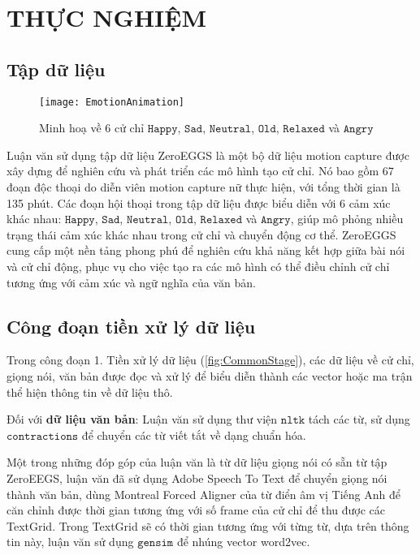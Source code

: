 \chapter{THỰC NGHIỆM}
\label{Chapter4}

\section{Tập dữ liệu}

\begin{figure}[H]
	\centering
	\texttt{[image: EmotionAnimation]}
	\caption{Minh hoạ về 6 cử chỉ $\texttt{Happy}$, $\texttt{Sad}$, $\texttt{Neutral}$, $\texttt{Old}$, $\texttt{Relaxed}$ và $\texttt{Angry}$}
\end{figure}

Luận văn sử dụng tập dữ liệu ZeroEGGS \cite{ghorbani2022zeroeggszeroshotexamplebasedgesture} là một bộ dữ liệu motion capture được xây dựng để nghiên cứu và phát triển các mô hình tạo cử chỉ. Nó bao gồm 67 đoạn độc thoại do diễn viên motion capture nữ thực hiện, với tổng thời gian là 135 phút. Các đoạn hội thoại trong tập dữ liệu được biểu diễn với 6 cảm xúc khác nhau: $\texttt{Happy}$, $\texttt{Sad}$, $\texttt{Neutral}$, $\texttt{Old}$, $\texttt{Relaxed}$ và $\texttt{Angry}$, giúp mô phỏng nhiều trạng thái cảm xúc khác nhau trong cử chỉ và chuyển động cơ thể. ZeroEGGS cung cấp một nền tảng phong phú để nghiên cứu khả năng kết hợp giữa bài nói và cử chỉ động, phục vụ cho việc tạo ra các mô hình có thể điều chỉnh cử chỉ tương ứng với cảm xúc và ngữ nghĩa của văn bản.

\section{Công đoạn tiền xử lý dữ liệu}
\label{sec:Preprocessing}

Trong công đoạn {1. Tiền xử lý dữ liệu} (\autoref{fig:CommonStage}), các dữ liệu về cử chỉ, giọng nói, văn bản được đọc và xử lý để biểu diễn thành các vector hoặc ma trận thể hiện thông tin về dữ liệu thô.

Đối với \textbf{dữ liệu văn bản}: Luận văn sử dụng thư viện $\texttt{nltk}$ tách các từ, sử dụng $\texttt{contractions}$ để chuyển các từ viết tắt về dạng chuẩn hóa.

Một trong những đóp góp của luận văn là từ dữ liệu giọng nói có sẵn từ tập ZeroEEGS, luận văn đã sử dụng Adobe Speech To Text để chuyển giọng nói thành văn bản, dùng Montreal Forced Aligner \cite{saxon2020robust} của từ điển âm vị Tiếng Anh để căn chỉnh được thời gian tương ứng với số frame của cử chỉ để thu được các TextGrid. Trong TextGrid sẽ có thời gian tương ứng với từng từ, dựa trên thông tin này, luận văn sử dụng  $\texttt{gensim}$ để nhúng vector word2vec.
 

